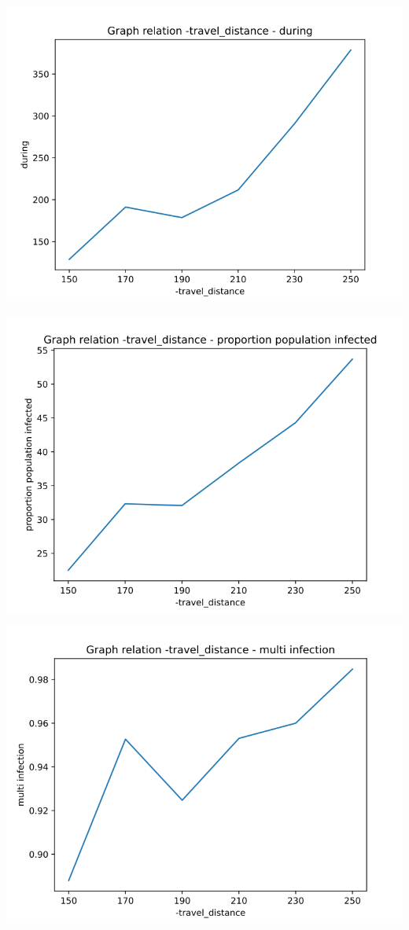 \documentclass[a4paper, 11pt]{article}
\begin{document}
				
				\includegraphics[scale=0.45]{attachements/travel_distance_during.png}
				
				\includegraphics[scale=0.45]{attachements/travel_distance_proportion.png}
				
				\includegraphics[scale=0.45]{attachements/travel_distance_multi_infection.png}
				
\end{document}

